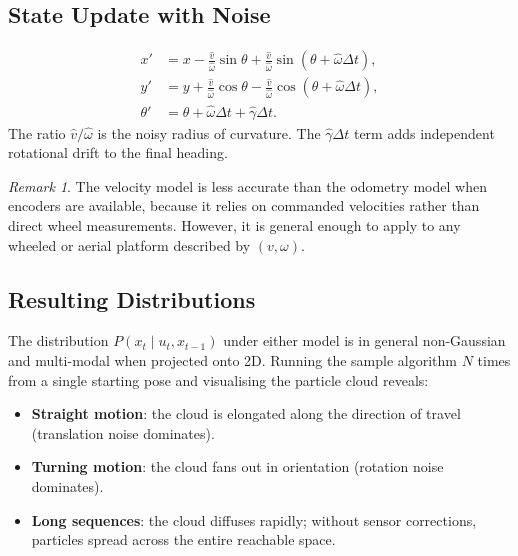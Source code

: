 \documentclass[11pt,a4paper]{article}
\theoremstyle{definition}
\theoremstyle{plain}
\theoremstyle{remark}
\newtheorem*{remark}{Remark}
\begin{document}
\subsection{State Update with Noise}

\begin{tcolorbox}[colback=blue!5!white,colframe=blue!75!black,title=\textbf{Velocity Model: Noisy State Update}]
\begin{align*}
    x'      &= x - \frac{\hat{v}}{\hat{\omega}}\sin\theta + \frac{\hat{v}}{\hat{\omega}}\sin(\theta + \hat{\omega}\Delta t), \\
    y'      &= y + \frac{\hat{v}}{\hat{\omega}}\cos\theta - \frac{\hat{v}}{\hat{\omega}}\cos(\theta + \hat{\omega}\Delta t), \\
    \theta' &= \theta + \hat{\omega}\Delta t + \hat{\gamma}\Delta t.
\end{align*}
The ratio $\hat{v}/\hat{\omega}$ is the noisy radius of curvature. The $\hat{\gamma}\Delta t$ term adds independent rotational drift to the final heading.
\end{tcolorbox}

\begin{remark}
The velocity model is less accurate than the odometry model when encoders are available, because it relies on commanded velocities rather than direct wheel measurements. However, it is general enough to apply to any wheeled or aerial platform described by $(v, \omega)$.
\end{remark}

\subsection{Resulting Distributions}

The distribution $P(x_t \mid u_t, x_{t-1})$ under either model is in general non-Gaussian and multi-modal when projected onto 2D. Running the sample algorithm $N$ times from a single starting pose and visualising the particle cloud reveals:
\begin{itemize}
    \item \textbf{Straight motion}: the cloud is elongated along the direction of travel (translation noise dominates).
    \item \textbf{Turning motion}: the cloud fans out in orientation (rotation noise dominates).
    \item \textbf{Long sequences}: the cloud diffuses rapidly; without sensor corrections, particles spread across the entire reachable space.
\end{itemize}
\end{document}
